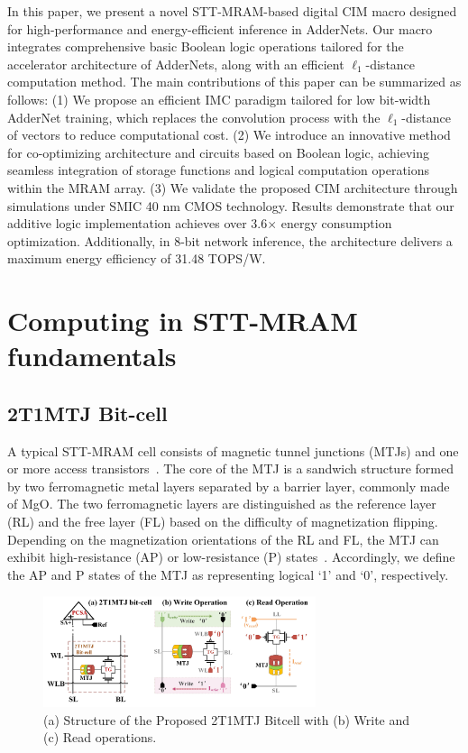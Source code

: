 \documentclass[submit]{elex2024}%
\begin{document}
In this paper, we present a novel STT-MRAM-based digital CIM macro designed for high-performance and energy-efficient inference in AdderNets. Our macro integrates comprehensive basic Boolean logic operations tailored for the accelerator architecture of AdderNets, along with an efficient $\ell_1$-distance computation method. The main contributions of this paper can be summarized as follows: (1) We propose an efficient IMC paradigm tailored for low bit-width AdderNet training, which replaces the convolution process with the  $\ell_1$-distance of vectors to reduce computational cost. (2) We introduce an innovative method for co-optimizing architecture and circuits based on Boolean logic, achieving seamless integration of storage functions and logical computation operations within the MRAM array. (3) We validate the proposed CIM architecture through simulations under SMIC 40 nm CMOS technology. Results demonstrate that our additive logic implementation achieves over 3.6$\times$ energy consumption optimization. Additionally, in 8-bit network inference, the architecture delivers a maximum energy efficiency of 31.48 TOPS/W. 

\section{Computing in STT-MRAM fundamentals}

\subsection{2T1MTJ Bit-cell}
A typical STT-MRAM cell consists of magnetic tunnel junctions (MTJs) and one or more access transistors~\cite{24}. The core of the MTJ is a sandwich structure formed by two ferromagnetic metal layers separated by a barrier layer, commonly made of MgO. The two ferromagnetic layers are distinguished as the reference layer (RL) and the free layer (FL) based on the difficulty of magnetization flipping. Depending on the magnetization orientations of the RL and FL, the MTJ can exhibit high-resistance (AP) or low-resistance (P) states~\cite{25}. Accordingly, we define the AP and P states of the MTJ as representing logical `1' and `0', respectively.
\begin{figure}[htb]
    \centering
    \includegraphics[width=8cm]{Figures/fig1.pdf}
    \caption{(a) Structure of the Proposed 2T1MTJ Bitcell with (b) Write and (c) Read operations.}
    \label{fig:1}
\end{figure}
\end{document}
